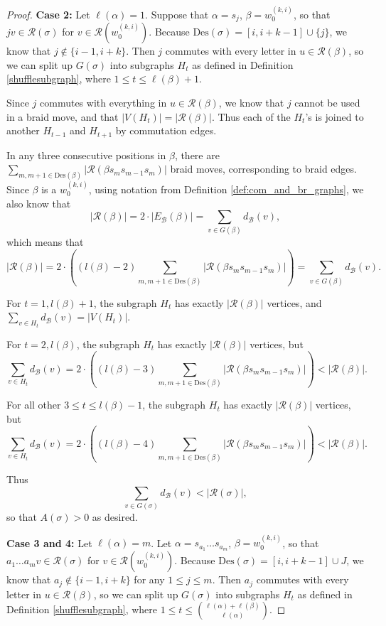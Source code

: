 \documentclass[11pt,reqno]{amsart}
\theoremstyle{definition}
\theoremstyle{notation}
\newcommand{\Des}{\text{Des}}
\newcommand{\calR}{\mathcal{R}}
\newcommand{\calB}{\mathcal{B}}
\begin{document}
\begin{proof}

\textbf{Case 2:} Let $\ell(\alpha) = 1$. Suppose that $\alpha = s_j$, $\beta =  w_0^{(k,i)}$, so that $j v \in \calR(\sigma)$ for $v\in \calR(w_0^{(k,i)})$. Because $\Des(\sigma) = [i,i+k-1] \cup \{j\}$, we know that $j\notin \{i-1, i+k\}$. Then $j$ commutes with every letter in $u\in \calR(\beta)$, so we can split up $G(\sigma)$ into subgraphs $H_t$ as defined in Definition \ref{shufflesubgraph}, where $1\leq t\leq \ell(\beta)+1$.

Since $j$ commutes with everything in $u\in \calR(\beta)$, we know that $j$ cannot be used in a braid move, and that $|V(H_t)| = |\calR(\beta)|$. Thus each of the $H_t$'s is joined to another $H_{t-1}$ and $H_{t+1}$ by commutation edges.

In any three consecutive positions in $\beta$, there are $\sum_{m,m+1 \in \Des(\beta)}|\calR(\beta s_ms_{m-1}s_m)|$ braid moves, corresponding to braid edges. Since $\beta$ is a $w_0^{(k,i)}$, using notation from Definition \ref{def:com_and_br_graphs}, we also know that 
\[
|\calR(\beta)| = 2\cdot |E_\calB(\beta)| = \sum_{v\in G(\beta)}d_\calB(v),
\]
which means that
\[
|\calR(\beta)|=2\cdot \left ( (l(\beta) -2) \sum_{m,m+1 \in \Des(\beta)}|\calR(\beta s_ms_{m-1}s_m)|\right ) = \sum_{v\in G(\beta)} d_\calB(v).
\]

For $t=1, l(\beta)+1$, the subgraph $H_t$ has exactly $|\calR(\beta)|$ vertices, and $\sum_{v\in H_t}d_\calB(v) = |V(H_t)|$.

For $t=2, l(\beta)$, the subgraph $H_t$ has exactly $|\calR(\beta)|$ vertices, but 
\[
\sum_{v\in H_t} d_\calB(v) = 2\cdot \left ( (l(\beta) -3) \sum_{m,m+1 \in \Des(\beta)}|\calR(\beta s_ms_{m-1}s_m)|\right ) <|\calR(\beta)|.
\]

For all other $3\leq t \leq l(\beta)-1$, the subgraph $H_t$ has exactly $|\calR(\beta)|$ vertices, but 
\[
\sum_{v\in H_t} d_\calB(v) = 2\cdot \left ( (l(\beta) -4) \sum_{m,m+1 \in \Des(\beta)}|\calR(\beta s_ms_{m-1}s_m)|\right ) <|\calR(\beta)|.
\]

Thus 
\[
\sum_{v\in G(\sigma)} d_\calB(v) < |\calR(\sigma)|,
\]
so that $A(\sigma)>0$ as desired.


\textbf{Case 3 and 4:} Let $\ell(\alpha) = m$. Let $\alpha = s_{a_1} \ldots s_{a_m}$, $\beta =  w_0^{(k,i)}$, so that $a_1\ldots a_m v \in \calR(\sigma)$ for $v\in \calR(w_0^{(k,i)})$. Because $\Des(\sigma) = [i,i+k-1] \cup J$, we know that $a_j\notin \{i-1, i+k\}$ for any $1\leq j \leq m$. Then $a_j$ commutes with every letter in $u\in \calR(\beta)$, so we can split up $G(\sigma)$ into subgraphs $H_t$ as defined in Definition \ref{shufflesubgraph}, where $1\leq t\leq \binom{\ell (\alpha) +\ell (\beta )}{\ell(\alpha)}$.


\end{proof}
\end{document}
